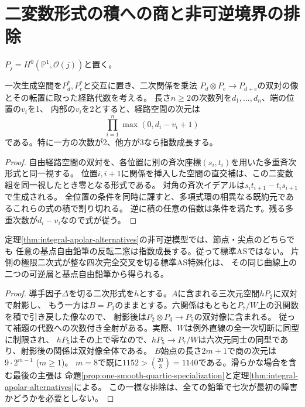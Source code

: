 \section{二変数形式の積への商と非可逆境界の排除}
\label{sec:binary-product-obstruction}
$P_j=H^0(\mathbb P^1,\mathcal O(j))$と置く。
\begin{lemma}[二変数形式の積の双対関係]\label{lem:binary-diagonal-paths}
一次生成空間を$P_d^*,P_e^*$と交互に置き、二次関係を乗法
$P_d\otimes P_e\to P_{d+e}$の双対の像とその転置に取った経路代数を考える。
長さ$n\ge2$の次数列を$d_1,\ldots,d_n$、端の位置の$v_i$を1、
内部の$v_i$を2とすると、経路空間の次元は
\[
 \prod_{i=1}^n\max(0,d_i-v_i+1)
\]
である。特に一方の次数が2、他方が3なら指数成長する。
\end{lemma}
\begin{proof}
自由経路空間の双対を、各位置に別の斉次座標$(s_i,t_i)$を用いた多重斉次形式と同一視する。
位置$i,i+1$に関係を挿入した空間の直交補は、この二変数組を同一視したとき零となる形式である。
対角の斉次イデアルは$s_i t_{i+1}-t_i s_{i+1}$で生成される。
全位置の条件を同時に課すと、多項式環の相異なる既約元であるこれらの式の積で割り切れる。
逆に積の任意の倍数は条件を満たす。残る多重次数が$d_i-v_i$なので式が従う。
\end{proof}

\begin{theorem}[全ての導手鉛筆の指数成長]\label{thm:all-conductor-pencils-excluded}
定理\ref{thm:integral-apolar-alternatives}の非可逆模型では、節点・尖点のどちらでも
任意の基点自由鉛筆の反転二窓は指数成長する。従って標準ASではない。
片側の極限二次式が整な四次完全交叉を切る標準AS特殊化は、
その同じ曲線上の二つの可逆層と基点自由鉛筆から得られる。
\end{theorem}
\begin{proof}
導手因子$\Delta$を切る二次形式を$h$とする。$A$に含まれる三次元空間$hP_2$に双対で射影し、
もう一方は$B=P_3$のままとする。六関係はもともと$P_7/W$上の汎関数を積で引き戻した像なので、
射影後は$P_2\otimes P_3\to P_5$の双対像に含まれる。
従って補題の代数への次数付き全射がある。実際、$W$は例外直線の全一次切断に同型に制限され、
$hP_5$はその上で零なので、$hP_5\to P_7/W$は六次元同士の同型であり、射影後の関係は双対像全体である。
$B$始点の長さ$2m+1$で商の次元は$9\cdot 2^{m-1}$ ($m\ge1$)。
$m=8$で既に$1152>\binom{20}{3}=1140$である。滑らかな場合を含む最後の主張は
命題\ref{prop:one-smooth-quartic-specialization}と定理\ref{thm:integral-apolar-alternatives}による。
この一様な排除は、全ての鉛筆で七次が最初の障害かどうかを必要としない。
\end{proof}

